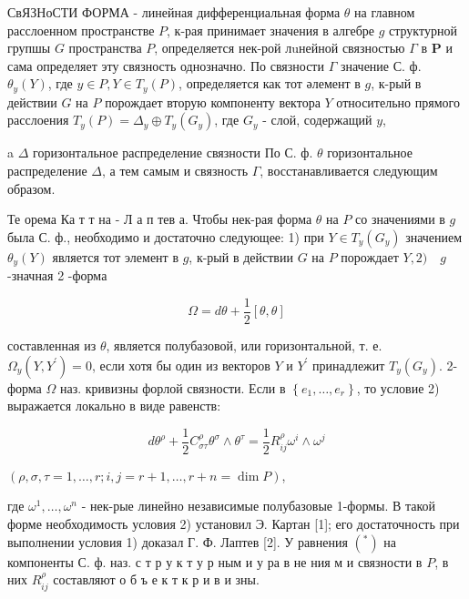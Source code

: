\documentclass[10pt]{article}
\begin{document}
СвЯЗНоСТИ ФОРМА - линейная дифференциальная форма $\theta$ на главном расслоенном пространстве $P$, к-рая принимает значения в алгебре $g$ структурной групшы $G$ пространства $P$, определяется нек-рой лuнейной связностью $\Gamma$ в $\boldsymbol{P}$ и сама определяет эту связность однозначно. По связности $\Gamma$ значение С. ф. $\theta_{y}(Y)$, где $y \in P, Y \in T_{y}(P)$, определяется как тот әлемент в $g$, к-рый в действии $G$ на $P$ порождает вторую компоненту вектора $Y$ относительно прямого расслоения $T_{y}(P)=\Delta_{y} \oplus T_{y}\left(G_{y}\right)$, где $G_{y}$ - слой, содержащий $y$,

a $\Delta$ горизонтальное распределение связности По С. ф. $\theta$ горизонтальное распределение $\Delta$, а тем самым и связность $\Gamma$, восстанавливается следующим образом.



Те орема Ка т т на - Л а п тев а. Чтобы нек-рая форма $\theta$ на $P$ со значениями в $g$ была С. ф., необходимо и достаточно следующее: 1) при $Y \in T_{y}\left(G_{y}\right)$ значением $\theta_{y}(Y)$ является тот элемент в $g$, к-рый в действии $G$ на $P$ порождает $Y, 2) \quad g$-значная 2 -форма



\[

\Omega=d \theta+\frac{1}{2}[\theta, \theta]

\]



составленная из $\theta$, является полубазовой, или горизонтальной, т. е. $\Omega_{y}\left(Y, Y^{\prime}\right)=0$, если хотя бы один из векторов $Y$ и $Y^{\prime}$ принадлежит $T_{y}\left(G_{y}\right)$. 2-форма $\Omega$ наз. кривизны форлой связности. Если в $\left\{e_{1}, \ldots, e_{r}\right\}$, то условие 2) выражается локально в виде равенств:



\[

d \theta^{\rho}+\frac{1}{2} C_{\sigma \tau}^{\rho} \theta^{\sigma} \wedge \theta^{\tau}=\frac{1}{2} R_{i j}^{\rho} \omega^{i} \wedge \omega^{j}

\]



$(\rho, \sigma, \tau=1, \ldots, r ; i, j=r+1, \ldots, r+n=\operatorname{dim} P)$,



где $\omega^{1}, \ldots, \omega^{n}$ - нек-рые линейно независимые полубазовые 1-формы. В такой форме необходимость условия 2) установил Э. Картан [1]; его достаточность при выполнении условия 1) доказал Г. Ф. Лаптев [2]. У равнения $\left(^{*}\right)$ на компоненты С. ф. наз. с т р у к т у р ным и у ра в не ния м и связности в $P$, в них $R_{i j}^{\rho}$ составляют о б ъ е к т к р и в и зны.
\end{document}
